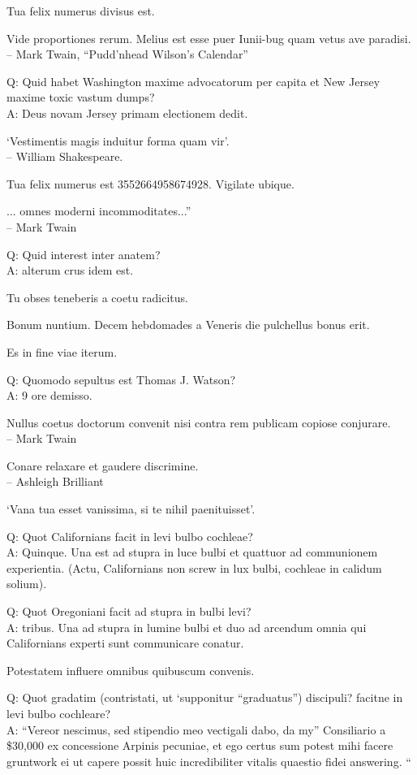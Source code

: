 \documentclass[titlepage,12pt]{memoir}
\begin{document}
Tua felix numerus divisus est.

Vide proportiones rerum. Melius est esse puer Iunii-bug
quam vetus ave paradisi.
\\-- Mark Twain, “Pudd’nhead Wilson’s Calendar”

Q: Quid habet Washington maxime advocatorum per capita et
New Jersey maxime toxic vastum dumps?\\
A: Deus novam Jersey primam electionem dedit.

‘Vestimentis magis induitur forma quam vir’.
\\-- William Shakespeare.

Tua felix numerus est 3552664958674928. Vigilate ubique.

... omnes moderni incommoditates...”
\\-- Mark Twain

Q: Quid interest inter anatem?\\
A: alterum crus idem est.

Tu obses teneberis a coetu radicitus.

Bonum nuntium. Decem hebdomades a Veneris die pulchellus bonus erit.

Es in fine viae iterum.

Q: Quomodo sepultus est Thomas J. Watson?\\
A: 9 ore demisso.

Nullus coetus doctorum convenit nisi contra rem publicam copiose conjurare.
\\-- Mark Twain

Conare relaxare et gaudere discrimine.
\\-- Ashleigh Brilliant

‘Vana tua esset vanissima, si te nihil paenituisset’.

Q: Quot Californians facit in levi bulbo cochleae?\\
A: Quinque. Una est ad stupra in luce bulbi et quattuor ad communionem
experientia. (Actu, Californians non screw in
lux bulbi, cochleae in calidum solium).

Q: Quot Oregoniani facit ad stupra in bulbi levi?\\
A: tribus. Una ad stupra in lumine bulbi et duo ad arcendum omnia
qui Californians experti sunt communicare conatur.

Potestatem influere omnibus quibuscum convenis.

Q: Quot gradatim (contristati, ut ‘supponitur “graduatus”) discipuli?
facitne in levi bulbo cochleare?\\
A: “Vereor nescimus, sed stipendio meo vectigali dabo, da my”
Consiliario a \$30,000 ex concessione Arpinis pecuniae, et ego certus sum
potest mihi facere gruntwork ei ut capere possit
huic incredibiliter vitalis quaestio fidei answering. “
\end{document}

